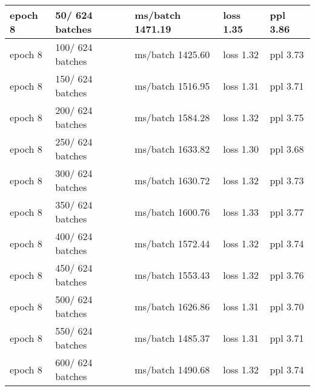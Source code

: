 \begin{center}
\begin{tabular}{ | m{3cm} | m{3cm}| m{4cm} | m{3cm} | m{3cm} | }
epoch   8 &    50/  624 batches & ms/batch 1471.19 & loss  1.35 & ppl     3.86\\ 
\hline
epoch   8 &   100/  624 batches & ms/batch 1425.60 & loss  1.32 & ppl     3.73\\ 
\hline
epoch   8 &   150/  624 batches & ms/batch 1516.95 & loss  1.31 & ppl     3.71\\ 
\hline
epoch   8 &   200/  624 batches & ms/batch 1584.28 & loss  1.32 & ppl     3.75\\ 
\hline
epoch   8 &   250/  624 batches & ms/batch 1633.82 & loss  1.30 & ppl     3.68\\ 
\hline
epoch   8 &   300/  624 batches & ms/batch 1630.72 & loss  1.32 & ppl     3.73\\ 
\hline
epoch   8 &   350/  624 batches & ms/batch 1600.76 & loss  1.33 & ppl     3.77\\ 
\hline
epoch   8 &   400/  624 batches & ms/batch 1572.44 & loss  1.32 & ppl     3.74\\ 
\hline
epoch   8 &   450/  624 batches & ms/batch 1553.43 & loss  1.32 & ppl     3.76\\ 
\hline
epoch   8 &   500/  624 batches & ms/batch 1626.86 & loss  1.31 & ppl     3.70\\ 
\hline
epoch   8 &   550/  624 batches & ms/batch 1485.37 & loss  1.31 & ppl     3.71\\ 
\hline
epoch   8 &   600/  624 batches & ms/batch 1490.68 & loss  1.32 & ppl     3.74\\ 
\hline


\end{tabular}
\end{center}
